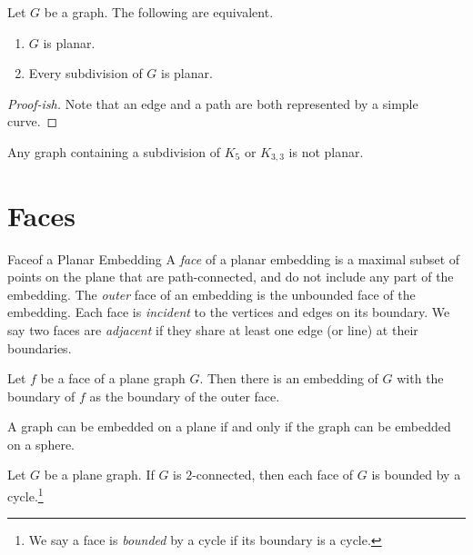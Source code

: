\documentclass[co342]{subfiles}
\begin{document}
    \begin{prop}{}
        Let $G$ be a graph. The following are equivalent.
        \begin{enumerate}
            \item $G$ is planar.
            \item Every subdivision of $G$ is planar.
        \end{enumerate}
    \end{prop}

    \begin{proof}[Proof-ish]
        Note that an edge and a path are both represented by a simple curve.
    \end{proof}

    \clearpage
    \begin{cor}{}
        Any graph containing a subdivision of $K_5$ or $K_{3,3}$ is not planar.
    \end{cor}	

    \section{Faces}
    
    \begin{definition}{Face}{of a Planar Embedding}
        A \emph{face} of a planar embedding is a maximal subset of points on the plane that are path-connected, and do not include any part of the embedding. The \emph{outer} face of an embedding is the unbounded face of the embedding. Each face is \emph{incident} to the vertices and edges on its boundary. We say two faces are \emph{adjacent} if they share at least one edge (or line) at their boundaries.
    \end{definition}

    \begin{prop}{}
        Let $f$ be a face of a plane graph $G$. Then there is an embedding of $G$ with the boundary of $f$ as the boundary of the outer face.
    \end{prop}

    \begin{prop}{}
        A graph can be embedded on a plane if and only if the graph can be embedded on a sphere.
    \end{prop}

    \begin{prop}{}
        Let $G$ be a plane graph. If $G$ is $2$-connected, then each face of $G$ is bounded by a cycle.\footnote{We say a face is \emph{bounded} by a cycle if its boundary is a cycle.}
    \end{prop}
\end{document}
